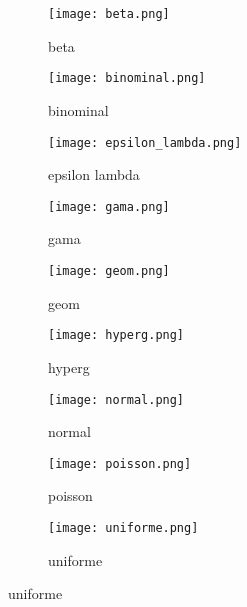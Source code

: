 \begin{figure}[H]\centering
\begin{subfigure}{0.3\textwidth}
\texttt{[image: beta.png]}
\caption{beta}

\end{subfigure}
\begin{subfigure}{0.3\textwidth}
    \texttt{[image: binominal.png]}
    \caption{binominal}

\end{subfigure}
\begin{subfigure}{0.3\textwidth}
    \texttt{[image: epsilon\_lambda.png]}
    \caption{epsilon lambda}

\end{subfigure}
\begin{subfigure}{0.3\textwidth}
    \texttt{[image: gama.png]}
    \caption{gama}

\end{subfigure}
\begin{subfigure}{0.3\textwidth}
    \texttt{[image: geom.png]}
    \caption{geom}

\end{subfigure}
\begin{subfigure}{0.3\textwidth}
    \texttt{[image: hyperg.png]}
    \caption{hyperg}

\end{subfigure}
\begin{subfigure}{0.3\textwidth}
    \texttt{[image: normal.png]}
    \caption{normal}

\end{subfigure}
\begin{subfigure}{0.3\textwidth}
    \texttt{[image: poisson.png]}
    \caption{poisson}


\end{subfigure}
\begin{subfigure}{0.3\textwidth}
    \texttt{[image: uniforme.png]}
    \caption{uniforme}
\end{subfigure}
\end{figure}